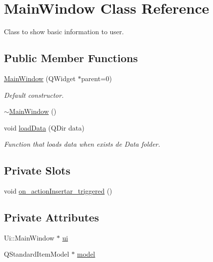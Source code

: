 \hypertarget{class_main_window}{\section{Main\+Window Class Reference}
\label{class_main_window}
}


Class to show basic information to user.  


\subsection*{Public Member Functions}
\begin{DoxyCompactItemize}
\item 
\hyperlink{class_main_window_a8b244be8b7b7db1b08de2a2acb9409db}{Main\+Window} (Q\+Widget $\ast$parent=0)
\begin{DoxyCompactList}\small\item\em Default constructor. \end{DoxyCompactList}\item 
\hyperlink{class_main_window_ae98d00a93bc118200eeef9f9bba1dba7}{$\sim$\+Main\+Window} ()
\item 
void \hyperlink{class_main_window_a932ff15a63daa01ca83de14172855ba3}{load\+Data} (Q\+Dir data)
\begin{DoxyCompactList}\small\item\em Function that loads data when exists de {\itshape Data} folder. \end{DoxyCompactList}\end{DoxyCompactItemize}
\subsection*{Private Slots}
\begin{DoxyCompactItemize}
\item 
void \hyperlink{class_main_window_a5e1e7858e4d3197098301e6743ab47c0}{on\+\_\+action\+Insertar\+\_\+triggered} ()
\end{DoxyCompactItemize}
\subsection*{Private Attributes}
\begin{DoxyCompactItemize}
\item 
Ui\+::\+Main\+Window $\ast$ \hyperlink{class_main_window_a35466a70ed47252a0191168126a352a5}{ui}
\item 
Q\+Standard\+Item\+Model $\ast$ \hyperlink{class_main_window_aa1a1f8ce9c37a7ac70d21402759638b3}{model}
\end{DoxyCompactItemize}


